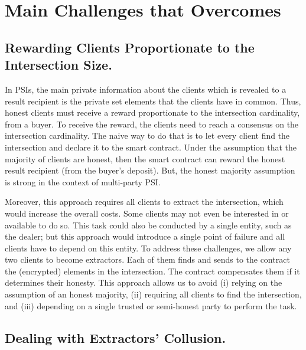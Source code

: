 




\section{Main Challenges that \withRew Overcomes}\label{sec::Annesidora-challenges}


\subsection{Rewarding Clients Proportionate to the Intersection Size.}
In PSIs, the main private information about the clients which is revealed to a result recipient is the private set elements that the clients have in common. Thus, honest clients must receive a reward proportionate to the intersection cardinality, from a buyer. To receive the reward, the clients need to reach a consensus on the intersection cardinality. The naive way to do that is to let every client find the intersection and declare it to the smart contract. Under the assumption that the majority of clients are honest, then the smart contract can reward the honest result recipient (from the buyer's deposit). But, the honest majority assumption is strong in the context of multi-party PSI. 

Moreover, this approach requires all clients to extract the intersection, which would increase the overall costs.  Some clients may not even be interested in or available to do so. This task could also be conducted by a single entity, such as the dealer; but this approach would introduce a single point of failure and all clients have to depend on this entity.  
%
To address these challenges, we allow any two clients to become extractors.  Each of them finds and sends to the contract the (encrypted) elements in the intersection. The contract compensates them if it determines their honesty. This approach allows us to avoid (i) relying on the assumption of an honest majority, (ii) requiring all clients to find the intersection, and (iii) depending on a single trusted or semi-honest party to perform the task. 






\subsection{Dealing with Extractors' Collusion.}
%


